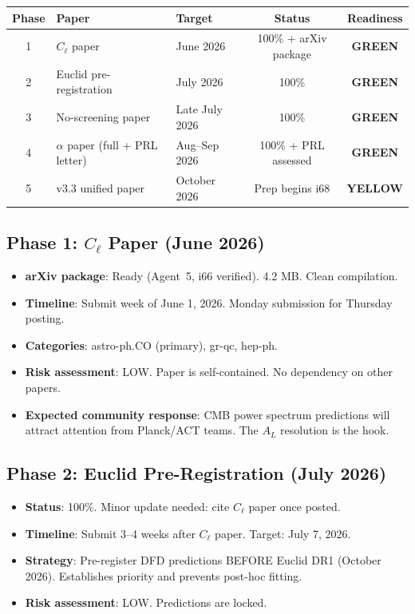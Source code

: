 \documentclass[11pt,a4paper]{article}
\newcommand{\GREEN}{\textcolor{dfdgreen}{\textbf{GREEN}}}
\newcommand{\YELLOW}{\textcolor{dfdyellow}{\textbf{YELLOW}}}
\begin{document}
\begin{center}
\begin{longtable}{cllcc}
\toprule
\textbf{Phase} & \textbf{Paper} & \textbf{Target} & \textbf{Status} & \textbf{Readiness} \\
\midrule
1 & $C_\ell$ paper & June 2026 & 100\% + arXiv package & \GREEN \\
2 & Euclid pre-registration & July 2026 & 100\% & \GREEN \\
3 & No-screening paper & Late July 2026 & 100\% & \GREEN \\
4 & $\alpha$ paper (full + PRL letter) & Aug--Sep 2026 & 100\% + PRL assessed & \GREEN \\
5 & v3.3 unified paper & October 2026 & Prep begins i68 & \YELLOW \\
\bottomrule
\end{longtable}
\end{center}

\subsection{Phase 1: $C_\ell$ Paper (June 2026)}

\begin{itemize}
\item \textbf{arXiv package}: Ready (Agent~5, i66 verified). 4.2 MB. Clean compilation.
\item \textbf{Timeline}: Submit week of June 1, 2026. Monday submission for Thursday posting.
\item \textbf{Categories}: astro-ph.CO (primary), gr-qc, hep-ph.
\item \textbf{Risk assessment}: LOW. Paper is self-contained. No dependency on other papers.
\item \textbf{Expected community response}: CMB power spectrum predictions will attract attention from Planck/ACT teams. The $A_L$ resolution is the hook.
\end{itemize}

\subsection{Phase 2: Euclid Pre-Registration (July 2026)}

\begin{itemize}
\item \textbf{Status}: 100\%. Minor update needed: cite $C_\ell$ paper once posted.
\item \textbf{Timeline}: Submit 3--4 weeks after $C_\ell$ paper. Target: July 7, 2026.
\item \textbf{Strategy}: Pre-register DFD predictions BEFORE Euclid DR1 (October 2026). Establishes priority and prevents post-hoc fitting.
\item \textbf{Risk assessment}: LOW. Predictions are locked.
\end{itemize}
\end{document}
